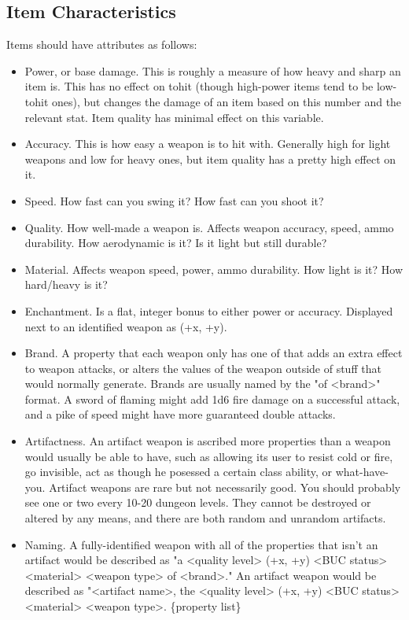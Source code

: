 \documentclass[a4paper,11pt]{article}
\begin{document}
\subsection{Item Characteristics}
Items should have attributes as follows:
\begin{itemize}
  \item Power, or base damage. This is roughly a measure of how heavy and sharp an item is. This has no effect on tohit (though high-power items tend to be low-tohit ones), but changes the damage of an item based on this number and the relevant stat. Item quality has minimal effect on this variable.
  \item Accuracy. This is how easy a weapon is to hit with. Generally high for light weapons and low for heavy ones, but item quality has a pretty high effect on it. 
  \item Speed. How fast can you swing it? How fast can you shoot it?
  \item Quality. How well-made a weapon is. Affects weapon accuracy, speed, ammo durability. How aerodynamic is it? Is it light but still durable?
  \item Material. Affects weapon speed, power, ammo durability. How light is it? How hard/heavy is it?
  \item Enchantment. Is a flat, integer bonus to either power or accuracy. Displayed next to an identified weapon as (+x, +y). 
  \item Brand. A property that each weapon only has one of that adds an extra effect to weapon attacks, or alters the values of the weapon outside of stuff that would normally generate. Brands are usually named by the "of <brand>" format. A sword of flaming might add 1d6 fire damage on a successful attack, and a pike of speed might have more guaranteed double attacks.
  \item Artifactness. An artifact weapon is ascribed more properties than a weapon would usually be able to have, such as allowing its user to resist cold or fire, go invisible, act as though he posessed a certain class ability, or what-have-you. Artifact weapons are rare but not necessarily good. You should probably see one or two every 10-20 dungeon levels. They cannot be destroyed or altered by any means, and there are both random and unrandom artifacts. 
  \item Naming. A fully-identified weapon with all of the properties that isn't an artifact would be described as "a <quality level> (+x, +y) <BUC status> <material> <weapon type> of <brand>." An artifact weapon would be described as "<artifact name>, the <quality level> (+x, +y) <BUC status> <material> <weapon type>. \{property list\}
\end{itemize}
\end{document}
